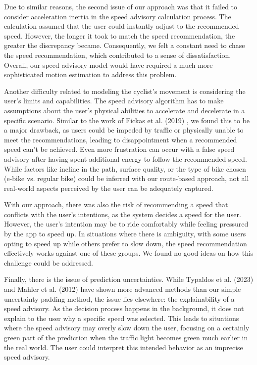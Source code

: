 Due to similar reasons, the second issue of our approach was that it failed to consider acceleration inertia in the speed advisory calculation process. The calculation assumed that the user could instantly adjust to the recommended speed. However, the longer it took to match the speed recommendation, the greater the discrepancy became. Consequently, we felt a constant need to chase the speed recommendation, which contributed to a sense of dissatisfaction. Overall, our speed advisory model would have required a much more sophisticated motion estimation to address this problem.

Another difficulty related to modeling the cyclist's movement is considering the user's limits and capabilities. The speed advisory algorithm has to make assumptions about the user's physical abilities to accelerate and decelerate in a specific scenario. Similar to the work of Fickas et al. (2019) \cite{fickas_fast_2019}, we found this to be a major drawback, as users could be impeded by traffic or physically unable to meet the recommendations, leading to disappointment when a recommended speed can't be achieved. Even more frustration can occur with a false speed advisory after having spent additional energy to follow the recommended speed. While factors like incline in the path, surface quality, or the type of bike chosen (e-bike vs. regular bike) could be inferred with our route-based approach, not all real-world aspects perceived by the user can be adequately captured.

With our approach, there was also the risk of recommending a speed that conflicts with the user's intentions, as the system decides a speed for the user. However, the user's intention may be to ride comfortably while feeling pressured by the app to speed up. In situations where there is ambiguity, with some users opting to speed up while others prefer to slow down, the speed recommendation effectively works against one of these groups. We found no good ideas on how this challenge could be addressed.

Finally, there is the issue of prediction uncertainties. While Typaldos et al. (2023) \cite{typaldos_modified_2023} and Mahler et al. (2012) \cite{mahler_reducing_2012} have shown more advanced methods than our simple uncertainty padding method, the issue lies elsewhere: the explainability of a speed advisory. As the decision process happens in the background, it does not explain to the user why a specific speed was selected. This leads to situations where the speed advisory may overly slow down the user, focusing on a certainly green part of the prediction when the traffic light becomes green much earlier in the real world. The user could interpret this intended behavior as an imprecise speed advisory.

